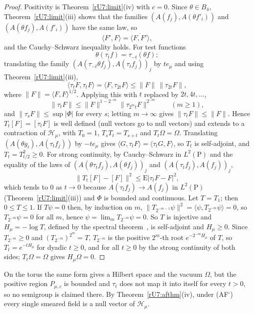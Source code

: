 \begin{proof}
Positivity is Theorem~\ref{rU7:limit}(iv) with $c=0$. Since $\theta\in B_4$,
Theorem~\ref{rU7:limit}(iii) shows that the families $(A(f_j),A(\theta f'_i))$
and $(A(\theta f_j),A(f'_i))$ have the same law, so
\[
\langle F',F\rangle=\overline{\langle F,F'\rangle},
\]
and the Cauchy--Schwarz inequality holds. For test functions
\[
\theta(\tau_tf)=\tau_{-t}(\theta f);
\]
translating the
family $(A(\tau_{-t}\theta f_j),A(\tau_tf_j))_j$ by $te_\mu$ and using
Theorem~\ref{rU7:limit}(iii),
\[
\langle\tau_tF,\tau_tF\rangle=\langle F,\tau_{2t}F\rangle\le\|F\|\,
\|\tau_{2t}F\| ,
\]
where $\|F\|=\langle F,F\rangle^{1/2}$. Applying this with $t$ replaced by $2t,4t,\dots$,
\[
\|\tau_tF\|\le\|F\|^{1-2^{-m}}\|\tau_{2^mt}F\|^{2^{-m}}\qquad(m\ge1),
\]
and
$\|\tau_sF\|\le\sup|\Phi|$ for every $s$; letting $m\to\infty$ gives
$\|\tau_tF\|\le\|F\|$. Hence $T_t[F]=[\tau_tF]$ is well defined (null
vectors go to null vectors) and extends to a contraction of $\mathcal H_\mu$,
with $T_0=1$, $T_sT_t=T_{s+t}$ and $T_t\Omega=\Omega$. Translating
$(A(\theta g_i),A(\tau_tf_j))$ by $-te_\mu$ gives $\langle G,\tau_tF\rangle=
\langle\tau_tG,F\rangle$, so $T_t$ is self-adjoint, and $T_t=T_{t/2}^2\ge0$.
For strong continuity, by Cauchy--Schwarz in $L^2(\mathrm P)$ and the
equality of the laws of $(A(\theta\tau_tf_j),A(\theta f_j))_j$ and $(A(\tau_t
f_j),A(f_j))_j$,
\[
\|T_t[F]-[F]\|^2\le\mathrm E|\tau_tF-F|^2 ,
\]
which tends to $0$ as $t\to0$
because $A(\tau_tf_j)\to A(f_j)$ in $L^2(\mathrm P)$
(Theorem~\ref{rU7:limit}(iii)) and $\Phi$ is bounded and continuous. Let $T=T_1$; then $0\le T\le1$. If
$T\psi=0$ then, by induction on $m$, $\|T_{2^{-m-1}}\psi\|^2=\langle\psi,
T_{2^{-m}}\psi\rangle=0$, so $T_{2^{-m}}\psi=0$ for all $m$, hence $\psi=\lim_mT_{2^{-m}}\psi=0$. So $T$ is injective and
$H_\mu=-\log T$, defined by the spectral theorem~\cite[Sec.~VII.2]{RS80},
is self-adjoint and $H_\mu\ge0$. Since $T_{2^{-m}}\ge0$ and
$(T_{2^{-m}})^{2^m}=T$, $T_{2^{-m}}$ is the positive $2^m$-th root
$e^{-2^{-m}H_\mu}$ of $T$, so $T_t=e^{-tH_\mu}$ for dyadic $t\ge0$, and for all
$t\ge0$ by the strong continuity of both sides; $T_t\Omega=\Omega$ gives
$H_\mu\Omega=0$.
\end{proof}

On the torus the same form gives a Hilbert space and the vacuum $\Omega$, but
the positive region $P_{\mu,c}$ is bounded and $\tau_t$ does not map it into
itself for every $t>0$, so no semigroup is claimed there. By
Theorem~\ref{rU7:afthm}(iv), under (AF$^\square$) every single smeared field is
a null vector of $\mathcal H_\mu$.


